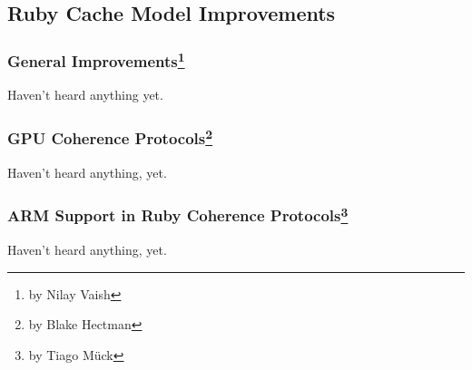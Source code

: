 \subsection[Ruby Cache Model Improvements]{Ruby Cache Model Improvements}

\subsubsection[General Improvements]{General Improvements\footnote{by Nilay Vaish}}

Haven't heard anything yet.

\subsubsection[GPU Coherence Protocols]{GPU Coherence Protocols\footnote{by Blake Hectman}}

Haven't heard anything, yet.

\subsubsection[ARM Support and Extensions]{ARM Support in Ruby Coherence Protocols\footnote{by Tiago M{\"u}ck}}

Haven't heard anything, yet.
